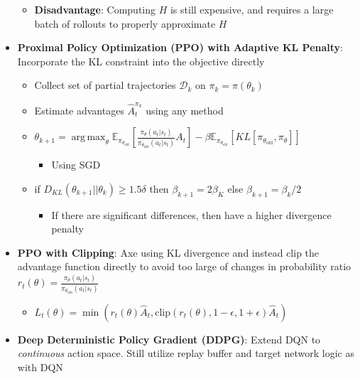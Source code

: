 \documentclass{article}
\providecommand{\tightlist}{%
  \setlength{\itemsep}{\GlobalItemSep}\setlength{\parskip}{\GlobalListParSkip}}
\newlength{\GlobalItemSep}
\newlength{\GlobalListParSkip}
\DeclareMathOperator*{\argmax}{arg\,max}
\begin{document}
\begin{multicols}{2}
\begin{itemize}
  \begin{itemize}
  \tightlist
  \item
    \textbf{Disadvantage}: Computing \(H\) is still expensive, and
    requires a large batch of rollouts to properly approximate \(H\)
  \end{itemize}
\item
  \textbf{Proximal Policy Optimization (PPO) with Adaptive KL Penalty}:
  Incorporate the KL constraint into the objective directly

  \begin{itemize}
  \tightlist
  \item
    Collect set of partial trajectories \(\mathcal{D}_k\) on
    \(\pi_k = \pi(\theta_k)\)
  \item
    Estimate advantages \(\hat{A}_t^{\pi_k}\) using any method
  \item
    \(\theta_{k+1} = \argmax_\theta \mathbb{E}_{\pi_{\theta_{\text{old}}}}[\frac{\pi_\theta (a_t | s_t)}{\pi_{\theta_{\text{old}}}(a_t | s_t)}A_t] - \beta \mathbb{E}_{\pi_{\theta_{\text{old}}}}[KL[\pi_{\theta_{\text{old}}}, \pi_\theta]]\)

    \begin{itemize}
    \tightlist
    \item
      Using SGD
    \end{itemize}
  \item
    if \(D_{KL}(\theta_{k+1}||\theta_k) \geq 1.5\delta\) then
    \(\beta_{k+1} = 2\beta_K\) else \(\beta_{k+1} = \beta_k / 2\)

    \begin{itemize}
    \tightlist
    \item
      If there are significant differences, then have a higher
      divergence penalty
    \end{itemize}
  \end{itemize}
\item
  \textbf{PPO with Clipping}: Axe using KL divergence and instead clip
  the advantage function directly to avoid too large of changes in
  probability ratio
  \(r_t(\theta) = \frac{\pi_\theta (a_t | s_t)}{\pi_{\theta_{\text{old}}}(a_t | s_t)}\)

  \begin{itemize}
  \tightlist
  \item
    \(L_t (\theta) = \min(r_t (\theta) \hat{A}_t, \text{clip}(r_t(\theta), 1 - \epsilon, 1 + \epsilon) \hat{A}_t)\)
  \end{itemize}
\item
  \textbf{Deep Deterministic Policy Gradient (DDPG)}: Extend DQN to
  \emph{continuous} action space. Still utilize replay buffer and target
  network logic as with DQN


\end{itemize}
\end{multicols}
\end{document}
